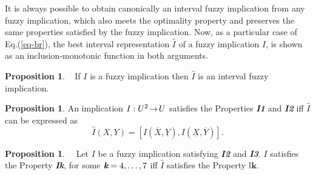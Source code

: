 \documentclass[12pt]{article}
\theoremstyle{plain}
\theoremstyle{remark}
\theoremstyle{definition}
\theoremstyle{proposition}
\newtheorem{proposition}[theorem]{Proposition}
\newcommand{\lra}{\hspace{-0.05cm}\rightarrow\hspace{-0.05cm}}
\newcommand{\II}{\mathbb{I} }
\begin{document}
It is always possible to obtain canonically an interval fuzzy implication from any fuzzy implication, which also meets the optimality property and preserves the same properties satisfied by the fuzzy
implication. Now, as a particular case of Eq.(\ref{eq-br}), the best interval representation $\widehat{I}$ of a fuzzy implication $I$, is shown as an inclusion-monotonic function in both arguments.

\begin{proposition}~\cite[Prop.~16]{Bed10b}
If $I$ is a fuzzy implication then $\widehat{I}$ is an interval
fuzzy implication.
\end{proposition}

\begin{proposition}\cite[Prop.~21]{Bed10b}\label{pro-char-cirI}
An implication $I: U^2 \lra U$ satisfies the Properties \emph{\textbf{I1}} and \emph{\textbf{I2}} iff $\widehat{I}$ can be expressed as\vspace{-0.1cm}
\begin{equation}\label{eq-int-i}
\widehat{I}(X,Y)= [I(\overline{X},\underline{Y}), I(\underline{X},\overline{Y})].
\end{equation}
\end{proposition}




\begin{proposition}~\cite[Prop.~23]{Bed10b}~\cite[Theorem~11]{BDR09}\label{cor-prop-int-imp}
Let $I$ be a fuzzy implication satisfying \emph{\textbf{I2}} and \emph{\textbf{I3}}. $I$ satisfies the Property
\emph{\textbf{Ik}}, for some $\emph{\textbf{k}}=4,\ldots,7$ iff $\widehat{I}$ satisfies the Property
$\II\mathbf{k}$.
\end{proposition}
\end{document}
